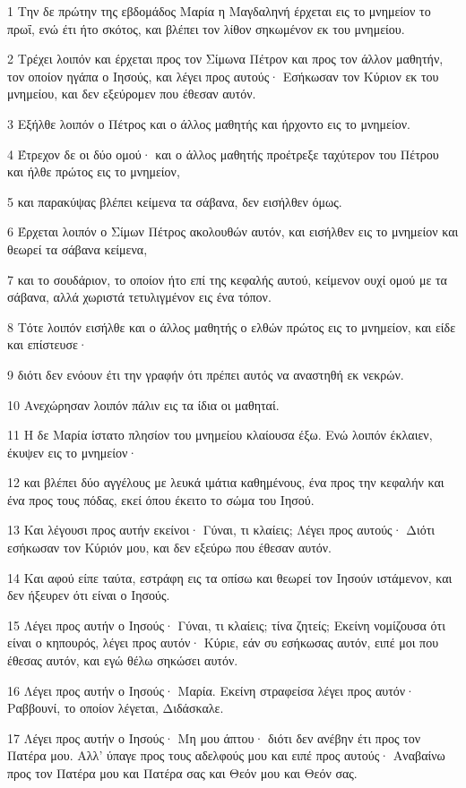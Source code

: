 \par 1 Την δε πρώτην της εβδομάδος Μαρία η Μαγδαληνή έρχεται εις το μνημείον το πρωΐ, ενώ έτι ήτο σκότος, και βλέπει τον λίθον σηκωμένον εκ του μνημείου.
\par 2 Τρέχει λοιπόν και έρχεται προς τον Σίμωνα Πέτρον και προς τον άλλον μαθητήν, τον οποίον ηγάπα ο Ιησούς, και λέγει προς αυτούς· Εσήκωσαν τον Κύριον εκ του μνημείου, και δεν εξεύρομεν που έθεσαν αυτόν.
\par 3 Εξήλθε λοιπόν ο Πέτρος και ο άλλος μαθητής και ήρχοντο εις το μνημείον.
\par 4 Έτρεχον δε οι δύο ομού· και ο άλλος μαθητής προέτρεξε ταχύτερον του Πέτρου και ήλθε πρώτος εις το μνημείον,
\par 5 και παρακύψας βλέπει κείμενα τα σάβανα, δεν εισήλθεν όμως.
\par 6 Έρχεται λοιπόν ο Σίμων Πέτρος ακολουθών αυτόν, και εισήλθεν εις το μνημείον και θεωρεί τα σάβανα κείμενα,
\par 7 και το σουδάριον, το οποίον ήτο επί της κεφαλής αυτού, κείμενον ουχί ομού με τα σάβανα, αλλά χωριστά τετυλιγμένον εις ένα τόπον.
\par 8 Τότε λοιπόν εισήλθε και ο άλλος μαθητής ο ελθών πρώτος εις το μνημείον, και είδε και επίστευσε·
\par 9 διότι δεν ενόουν έτι την γραφήν ότι πρέπει αυτός να αναστηθή εκ νεκρών.
\par 10 Ανεχώρησαν λοιπόν πάλιν εις τα ίδια οι μαθηταί.
\par 11 Η δε Μαρία ίστατο πλησίον του μνημείου κλαίουσα έξω. Ενώ λοιπόν έκλαιεν, έκυψεν εις το μνημείον·
\par 12 και βλέπει δύο αγγέλους με λευκά ιμάτια καθημένους, ένα προς την κεφαλήν και ένα προς τους πόδας, εκεί όπου έκειτο το σώμα του Ιησού.
\par 13 Και λέγουσι προς αυτήν εκείνοι· Γύναι, τι κλαίεις; Λέγει προς αυτούς· Διότι εσήκωσαν τον Κύριόν μου, και δεν εξεύρω που έθεσαν αυτόν.
\par 14 Και αφού είπε ταύτα, εστράφη εις τα οπίσω και θεωρεί τον Ιησούν ιστάμενον, και δεν ήξευρεν ότι είναι ο Ιησούς.
\par 15 Λέγει προς αυτήν ο Ιησούς· Γύναι, τι κλαίεις; τίνα ζητείς; Εκείνη νομίζουσα ότι είναι ο κηπουρός, λέγει προς αυτόν· Κύριε, εάν συ εσήκωσας αυτόν, ειπέ μοι που έθεσας αυτόν, και εγώ θέλω σηκώσει αυτόν.
\par 16 Λέγει προς αυτήν ο Ιησούς· Μαρία. Εκείνη στραφείσα λέγει προς αυτόν· Ραββουνί, το οποίον λέγεται, Διδάσκαλε.
\par 17 Λέγει προς αυτήν ο Ιησούς· Μη μου άπτου· διότι δεν ανέβην έτι προς τον Πατέρα μου. Αλλ' ύπαγε προς τους αδελφούς μου και ειπέ προς αυτούς· Αναβαίνω προς τον Πατέρα μου και Πατέρα σας και Θεόν μου και Θεόν σας.
